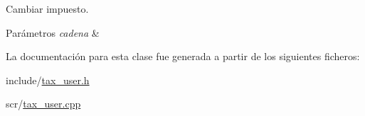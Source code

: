 Cambiar impuesto. 


\begin{DoxyParams}{Parámetros}
{\em cadena} & \\
\hline
\end{DoxyParams}


La documentación para esta clase fue generada a partir de los siguientes ficheros\+:\begin{DoxyCompactItemize}
\item 
include/\hyperlink{tax__user_8h}{tax\+\_\+user.\+h}\item 
scr/\hyperlink{tax__user_8cpp}{tax\+\_\+user.\+cpp}\end{DoxyCompactItemize}
